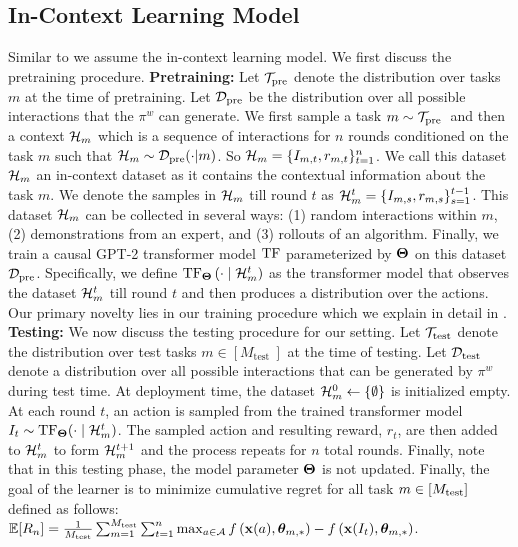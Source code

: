 \documentclass[10pt]{article}
\theoremstyle{plain}
\theoremstyle{definition}
\theoremstyle{remark}
\begin{document}
\subsection{In-Context Learning Model}
\label{sec:learning-model}
\vspace*{-0.7em}
Similar to \citet{lee2023supervised, sinii2023context, lin2023transformers, ma2023rethinking, liu2023reason, liu2023self} we assume the in-context learning model. We first discuss the pretraining procedure.
\textbf{Pretraining:} Let $\mathcal{T}_{\text{pre}}$ denote the distribution over tasks $m$ at the time of pretraining.
Let $\mathcal{D}_{\text{pre}}$ be the distribution over all possible interactions that the $\pi^w$ can generate.
We first sample a task $m\sim \mathcal{T}_{\text {pre }}$ and then a context $\mathcal{H}_m$ which is a sequence of interactions for $n$ rounds conditioned on the task $m$ such that $\mathcal{H}_m\sim\mathcal{D}_{\text{pre}}(\cdot|m)$.
So $\mathcal{H}_m = \{I_{m,t}, r_{m,t}\}_{t=1}^n$.
We call this dataset $\mathcal{H}_m$ an in-context dataset as it contains the contextual information about the task $m$.
We denote the samples in $\mathcal{H}_m$ till round $t$ as $\mathcal{H}_{m}^t = \{I_{m,s}, r_{m,s}\}_{s=1}^{t-1}$.
This dataset $\mathcal{H}_m$ can be collected in several ways: (1) random interactions within $m$, (2) demonstrations from an expert, and (3) rollouts of an algorithm.
Finally, we train a causal GPT-2 transformer model $\mathrm{TF}$ parameterized by $\mathbf{\Theta}$ on this dataset $\mathcal{D}_{\text{pre}}$.
Specifically, we define $\mathrm{TF}_{\mathbf{\Theta}}\left(\cdot \mid \mathcal{H}^t_m\right)$ as the transformer model that observes the dataset $\mathcal{H}^t_m$ till round $t$ and then produces a distribution over the actions.
Our primary novelty lies in our training procedure which we explain in detail in .
\textbf{Testing:} We now discuss the testing procedure for our setting. Let $\mathcal{T}_{\text{test}}$ denote the distribution over test tasks $m\in [M_{\text {test }}]$ at the time of testing.
Let $\mathcal{D}_{\text{test}}$ denote a distribution over all possible interactions that can be generated by $\pi^w$ during test time.
At deployment time, the dataset $\mathcal{H}_m^0 \leftarrow \{\emptyset\}$ is initialized empty. At each round $t$, an action is sampled from the trained transformer model $I_t \sim \mathrm{TF}_{\mathbf{\Theta}}(\cdot \mid \mathcal{H}^t_m)$. The sampled action and resulting reward, $r_t$, are then added to $\mathcal{H}^t_m$ to form $\mathcal{H}^{t+1}_m$ and the process repeats for $n$ total rounds.
Finally, note that in this testing phase, the model parameter $\mathbf{\Theta}$ is not updated.
Finally, the goal of the learner is to minimize cumulative regret for all task $m\in [M_{\text{test}}]$ defined as follows:
$
    \mathbb{E}[R_n] = \frac{1}{M_{\text{test}}}\sum_{m=1}^{M_{\text{test}}}\sum_{t=1}^n\max_{a\in\mathcal{A}}f\left( \mathbf{x}(a), \boldsymbol{\theta}_{m,*} \right) - f\left( \mathbf{x}(I_t), \boldsymbol{\theta}_{m,*} \right)$.
\vspace*{-0.5em}
\end{document}
